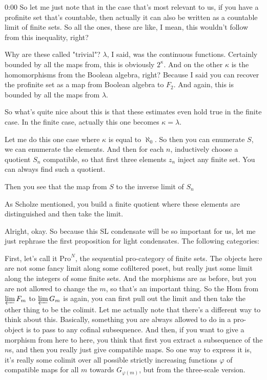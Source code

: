 \begin{unfinished}{0:00}
So let me just note that in the case that's most relevant to us, if you have a profinite set that's countable, then actually it can also be written as a countable limit of finite sets. So all the ones, these are like, I mean, this wouldn't follow from this inequality, right?

Why are these called "trivial"? $\lambda$, I said, was the continuous functions. Certainly bounded by all the maps from, this is obviously $2^{\kappa}$. And on the other $\kappa$ is the homomorphisms from the Boolean algebra, right? Because I said you can recover the profinite set as a map from Boolean algebra to $F_2$. And again, this is bounded by all the maps from $\lambda$.

So what's quite nice about this is that these estimates even hold true in the finite case. In the finite case, actually this one becomes $\kappa = \lambda$.

Let me do this one case where $\kappa$ is equal to $\aleph_0$. So then you can enumerate $S$, we can enumerate the elements. And then for each $n$, inductively choose a quotient $S_n$ compatible, so that first three elements $z_n$ inject any finite set. You can always find such a quotient.

Then you see that the map from $S$ to the inverse limit of $S_n$

As Scholze mentioned, you build a finite quotient where these elements are distinguished and then take the limit.

Alright, okay. So because this SL condensate will be so important for us, let me just rephrase the first proposition for light condensates. The following categories:

First, let's call it $\text{Pro}^N$, the sequential pro-category of finite sets. The objects here are not some fancy limit along some cofiltered poset, but really just some limit along the integers of some finite sets. And the morphisms are as before, but you are not allowed to change the $m$, so that's an important thing. So the $\text{Hom}$ from $\varprojlim F_m$ to $\varprojlim G_m$ is again, you can first pull out the limit and then take the other thing to be the colimit. Let me actually note that there's a different way to think about this. Basically, something you are always allowed to do in a pro-object is to pass to any cofinal subsequence. And then, if you want to give a morphism from here to here, you think that first you extract a subsequence of the $n$s, and then you really just give compatible maps. So one way to express it is, it's really some colimit over all possible strictly increasing functions $\varphi$ of compatible maps for all $m$ towards $G_{\varphi(m)}$, but from the three-scale version.


\end{unfinished}
